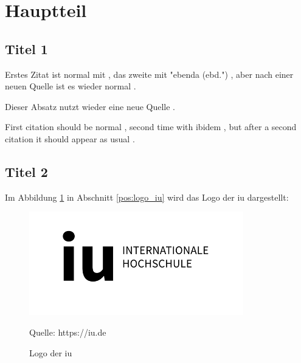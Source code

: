 \section{Hauptteil}

\lipsum[1]

\subsection{Titel 1}

Erstes Zitat ist normal mit \parencite[12]{sigfridsson}, das zweite mit "ebenda (ebd.")
\parencite[78-79]{sigfridsson}, aber nach einer neuen Quelle \parencite[30]{geer} ist es wieder normal \parencite[20]{sigfridsson}.

Dieser Absatz nutzt wieder eine neue Quelle \parencite{nussbaum}.

First citation should be normal \parencite[11]{sigfridsson}, second time with ibidem
\parencite[95]{sigfridsson}, but after a second citation \parencite[282]{geer} it should appear as usual \parencite[2]{sigfridsson}.

\subsection{Titel 2}

Im Abbildung \ref*{fig:logo_iu} in Abschnitt \ref*{pos:logo_iu} wird das Logo der \ac{iu} dargestellt:

\begin{figure}[ht!]
    \label{pos:logo_iu}
    \includegraphics[scale=0.35]{logos/IU.png}
    \caption[Logo der \acs{iu}]{Logo der \ac{iu}}{Quelle: https://iu.de}
    \label{fig:logo_iu}
\end{figure}


\lipsum[7-8]